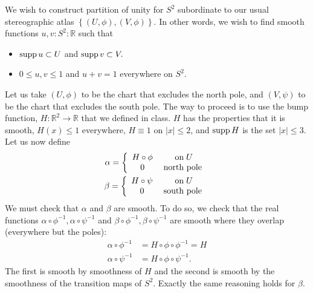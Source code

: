 \documentclass{../../mathnotes}
\begin{document}
We wish to construct partition of unity for $S^2$ subordinate to our usual stereographic atlas $\left\{ (U,\phi),(V,\phi) \right\}$.
In other words, we wish to find smooth functions $u,v:S^2:\mathbb{R}$ such that
\begin{itemize}
    \item $\operatorname{supp} u \subset U$ and $\operatorname{supp} v \subset V.$
    \item $0\leq u,v\leq 1$ and $u+v=1$ everywhere on $S^2$.
\end{itemize}
Let us take $(U,\phi)$ to be the chart that excludes the north pole, and $(V,\psi)$ to be the chart that excludes the south pole.
The way to proceed is to use the bump function, $H:\mathbb{R}^2\to\mathbb{R}$ that we defined in class. $H$ has the properties that
it is smooth, $H(x)\leq1$ everywhere, $H\equiv 1$ on $|x|\leq2$, and $\operatorname{supp} H$ is the set $|x|\leq 3$. Let us now define
\begin{align*}
    \alpha=
    \left\{
        \begin{array}{cc}
            H\circ \phi & \;\textnormal{on}\; U\\
            0 & \;\textnormal{north pole}\;
        \end{array}
    \right.
    \\
    \beta=
    \left\{
        \begin{array}{cc}
            H\circ \psi & \;\textnormal{on}\; U\\
            0 & \;\textnormal{south pole}\;
        \end{array}
    \right.
\end{align*}
We must check that $\alpha$ and $\beta$ are smooth. To do so, we check that the real functions $\alpha\circ\phi^{-1},\alpha\circ\psi^{-1}$ and
$\beta\circ\phi^{-1},\beta\circ\psi^{-1}$ are smooth where they overlap (everywhere but the poles):
\begin{align*}
    \alpha\circ\phi^{-1}&=H\circ\phi\circ\phi^{-1}=H\\
    \alpha\circ\psi^{-1}&=H\circ\phi\circ\psi^{-1}.
\end{align*}
The first is smooth by smoothness of $H$ and the second is smooth by the smoothness of the transition maps of $S^2$.
Exactly the same reasoning holds for $\beta$.
\end{document}
